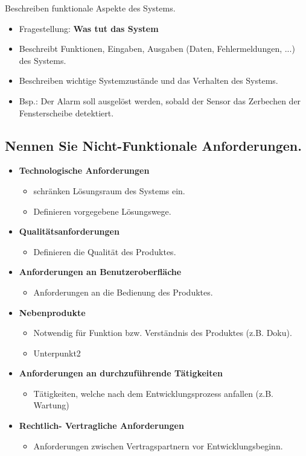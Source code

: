 Beschreiben funktionale Aspekte des Systems.

\begin{itemize}
    \item Fragestellung: \textbf{Was tut das System}
    \item Beschreibt Funktionen, Eingaben, Ausgaben (Daten, Fehlermeldungen, ...) des Systems.
    \item Beschreiben wichtige Systemzustände und das Verhalten des Systems.
    \item Bsp.: Der Alarm soll ausgelöst werden, sobald der Sensor das Zerbechen der Fensterscheibe detektiert.
\end{itemize}

\subsection{Nennen Sie Nicht-Funktionale Anforderungen.}

\begin{itemize}
    \item \textbf{Technologische Anforderungen}
        \begin{itemize}
            \item schränken Lösungsraum des Systems ein.
            \item Definieren vorgegebene Lösungswege.
        \end{itemize}
    \item \textbf{Qualitätsanforderungen}
        \begin{itemize}
            \item Definieren die Qualität des Produktes.
        \end{itemize}
    \item \textbf{Anforderungen an Benutzeroberfläche}
        \begin{itemize}
            \item Anforderungen an die Bedienung des Produktes.
        \end{itemize}
    \item \textbf{Nebenprodukte}
        \begin{itemize}
            \item Notwendig für Funktion bzw. Verständnis des Produktes (z.B. Doku).
            \item Unterpunkt2
        \end{itemize}
    \item \textbf{Anforderungen an durchzuführende Tätigkeiten}
        \begin{itemize}
            \item Tätigkeiten, welche nach dem Entwicklungsprozess anfallen (z.B. Wartung)
        \end{itemize}
    \item \textbf{Rechtlich- Vertragliche Anforderungen}
        \begin{itemize}
            \item Anforderungen zwischen Vertragspartnern vor Entwicklungsbeginn.
        \end{itemize}
\end{itemize}


